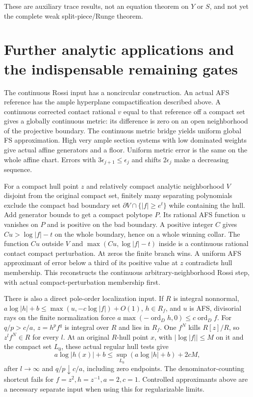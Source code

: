 \documentclass[
  10pt,
]{article}
\begin{document}
These are auxiliary trace results, not an equation theorem on \(Y\) or
\(S\), and not yet the complete weak split-piece/Runge theorem.

\section{Further analytic applications and the indispensable remaining
gates}\label{further-analytic-applications-and-the-indispensable-remaining-gates}

The continuous Rossi input has a noncircular construction. An actual AFS
reference has the ample hyperplane compactification described above. A
continuous corrected contact rational \(v\) equal to that reference off
a compact set gives a globally continuous metric: its difference is zero
on an open neighborhood of the projective boundary. The continuous
metric bridge yields uniform global FS approximation. High very ample
section systems with low dominated weights give actual affine generators
and a floor. Uniform metric error is the same on the whole affine chart.
Errors with \(3\epsilon_{j+1}\le\epsilon_j\) and shifts \(2\epsilon_j\)
make a decreasing sequence.

For a compact hull point \(z\) and relatively compact analytic
neighborhood \(V\) disjoint from the original compact set, finitely many
separating polynomials exclude the compact bad boundary set
\(\partial V\cap\{|f|\ge e^t\}\) while containing the hull. Add
generator bounds to get a compact polytope \(P\). Its rational AFS
function \(u\) vanishes on \(P\) and is positive on the bad boundary. A
positive integer \(C\) gives \(Cu>\log|f|-t\) on the whole boundary,
hence on a whole winning collar. The function \(Cu\) outside \(V\) and
\(\max(Cu,\log|f|-t)\) inside is a continuous rational contact compact
perturbation. At zeros the finite branch wins. A uniform AFS approximant
of error below a third of its positive value at \(z\) contradicts hull
membership. This reconstructs the continuous arbitrary-neighborhood
Rossi step, with actual compact-perturbation membership first.

There is also a direct pole-order localization input. If \(R\) is
integral nonnormal, \(a\log|h|+b\le\max(u,-c\log|f|)+O(1)\),
\(h\in R_f\), and \(u\) is AFS, divisorial rays on the finite
normalization force
\(a\max(-\operatorname{ord}_Dh,0)\le c\operatorname{ord}_Df\). For
\(q/p>c/a\), \(z=h^pf^q\) is integral over \(R\) and lies in \(R_f\).
One \(f^N\) kills \(R[z]/R\), so \(z^lf^N\in R\) for every \(l\). At an
original \(R\)-hull point \(x\), with \(|\log|f||\le M\) on it and the
compact set \(L_0\), these actual regular hull tests give
\[a\log|h(x)|+b\le\sup_{L_0}(a\log|h|+b)+2cM,\] after \(l\to\infty\) and
\(q/p\downarrow c/a\), including zero endpoints. The
denominator-counting shortcut fails for \(f=z^2,h=z^{-1},a=2,c=1\).
Controlled approximants above are a necessary separate input when using
this for regularizable limits.
\end{document}
